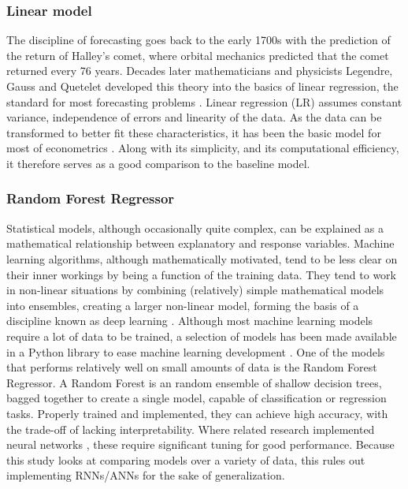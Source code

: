 

\subsubsection{Linear model}

The discipline of forecasting goes back to the early 1700s with the prediction of the return of Halley's comet, where orbital mechanics predicted that the comet returned every 76 years. Decades later mathematicians and physicists Legendre, Gauss and Quetelet developed this theory into the basics of linear regression, the standard for most forecasting problems \cite{stigler1986history}. Linear regression (LR) assumes constant variance, independence of errors and linearity of the data. As the data can be transformed to better fit these characteristics, it has been the basic model for most of econometrics \cite{greene2003econometric}. Along with its simplicity, and its computational efficiency, it therefore serves as a good comparison to the baseline model.

\subsubsection{Random Forest Regressor}

Statistical models, although occasionally quite complex, can be explained as a mathematical relationship between explanatory and response variables. Machine learning algorithms, although mathematically motivated, tend to be less clear on their inner workings by being a function of the training data. They tend to work in non-linear situations by combining (relatively) simple mathematical models into ensembles, creating a larger non-linear model, forming the basis of a discipline known as deep learning \cite{lecun2015deep, goodfellow2016deep}. Although most machine learning models require a lot of data to be trained, a selection of models has been made available in a Python library to ease machine learning development \cite{sklearn2012}. One of the models that performs relatively well on small amounts of data is the Random Forest Regressor. A Random Forest is an random ensemble of shallow decision trees, bagged together to create a single model, capable of classification or regression tasks. Properly trained and implemented, they can achieve high accuracy, with the trade-off of lacking interpretability. Where related research implemented neural networks \cite{thawornwong2004forecasting}, these require significant tuning for good performance. Because this study looks at comparing models over a variety of data, this rules out implementing RNNs/ANNs for the sake of generalization.

